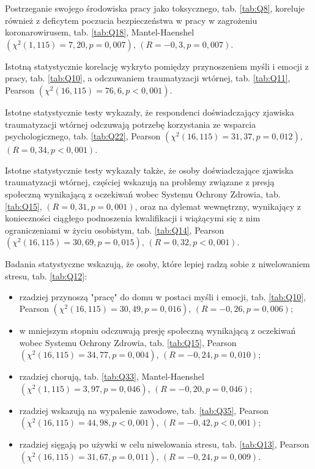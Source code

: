 \documentclass[a4paper,12pt,twoside,openright]{mwrep}
\begin{document}
Postrzeganie swojego środowiska pracy jako toksycznego, tab. \ref{tab:Q8}, koreluje również z deficytem poczucia bezpieczeństwa w pracy w zagrożeniu koronarowirusem, tab. \ref{tab:Q18}, Mantel-Haenshel $(\chi^2 (1, 115) = 7,20, p=0,007)$, $(R = -0,3, p = 0,007)$. 

Istotną statystycznie korelację wykryto pomiędzy przynoszeniem myśli i emocji z pracy, tab. \ref{tab:Q10}, a odczuwaniem traumatyzacji wtórnej, tab. \ref{tab:Q11}, Pearson $(\chi^2 (16, 115) = 76,6, p < 0,001)$.
  
Istotne statystycznie testy wykazały, że respondenci doświadczający zjawiska traumatyzacji wtórnej odczuwają potrzebę korzystania ze wsparcia psychologicznego, tab. \ref{tab:Q22}, Pearson $(\chi^2 (16, 115) = 31,37, p = 0,012)$,  $(R = 0,34, p < 0,001)$.

Istotne statystycznie testy wykazały także, że osoby doświadczające zjawiska traumatyzacji wtórnej, częściej wskazują na problemy związane z presją społeczną wynikającą z oczekiwań wobec Systemu Ochrony Zdrowia, tab. \ref{tab:Q15}, $(R = 0,31, p = 0,001)$, oraz na dylemat wewnętrzny, wynikający z konieczności ciągłego podnoszenia kwalifikacji i wiążącymi się z nim ograniczeniami w życiu osobistym, tab. \ref{tab:Q14}, Pearson $(\chi^2 (16, 115) = 30,69, p = 0,015)$,  $(R = 0,32, p < 0,001)$.



Badania statystyczne wskazują, że osoby, które lepiej radzą sobie z niwelowaniem stresu, tab. \ref{tab:Q12}:
	\begin{itemize}
		\item rzadziej przynoszą "pracę" do domu w postaci myśli i emocji, tab. \ref{tab:Q10}, Pearson $(\chi^2 (16, 115) = 30,49, p = 0,016)$,  $(R = -0,26, p = 0,006)$;
		\item w mniejszym stopniu odczuwają presję społeczną wynikającą z oczekiwań wobec Systemu Ochrony Zdrowia, tab. \ref{tab:Q15},  Pearson $(\chi^2 (16, 115) = 34,77, p = 0,004)$, $(R = -0,24, p = 0,010)$;
		\item rzadziej chorują, tab. \ref{tab:Q33}, Mantel-Haenshel $(\chi^2 (1, 115) = 3,97, p = 0,046)$, $(R = -0,20, p = 0,046)$;
		\item rzadziej wskazują na wypalenie zawodowe, tab. \ref{tab:Q35}, Pearson $(\chi^2 (16, 115) = 44,98, p < 0,001)$, $(R = -0,42, p < 0,001)$;
		\item rzadziej sięgają po używki w celu niwelowania stresu, tab. \ref{tab:Q13}, Pearson $(\chi^2 (16, 115) = 31,67, p = 0,011)$, $(R = -0,24, p = 0,009)$.
	\end{itemize}
	
\end{document}

